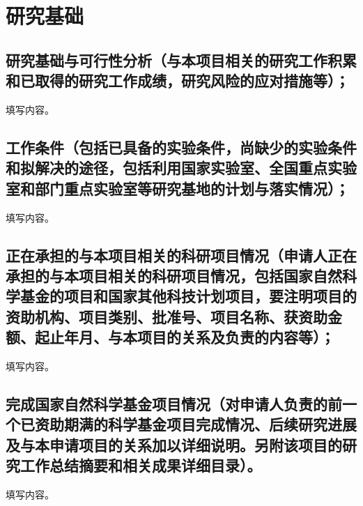\par
\chapter{\textbf{研究基础}}

\section{\textbf{研究基础与可行性分析}（与本项目相关的研究工作积累和已取得的研究工作成绩，研究风险的应对措施等）；}
填写内容。

\section{\textbf{工作条件}（包括已具备的实验条件，尚缺少的实验条件和拟解决的途径，包括利用国家实验室、全国重点实验室和部门重点实验室等研究基地的计划与落实情况）；}
填写内容。

\section{\textbf{正在承担的与本项目相关的科研项目情况}（申请人正在承担的与本项目相关的科研项目情况，包括国家自然科学基金的项目和国家其他科技计划项目，要注明项目的资助机构、项目类别、批准号、项目名称、获资助金额、起止年月、与本项目的关系及负责的内容等）；}
填写内容。

\section{\textbf{完成国家自然科学基金项目情况}（对申请人负责的前一个已资助期满的科学基金项目完成情况、后续研究进展及与本申请项目的关系加以详细说明。另附该项目的研究工作总结摘要和相关成果详细目录）。}
填写内容。
